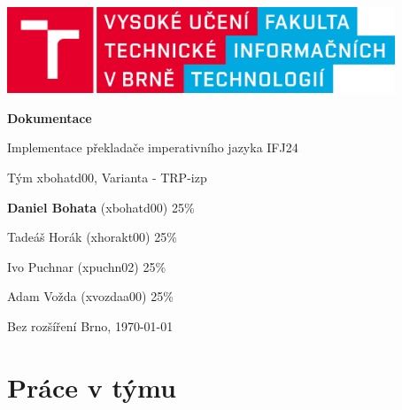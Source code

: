 \documentclass[a4paper, 12pt]{article}
\begin{document}
    \begin{titlepage}
        \begin{center}
            \includegraphics[width=0.87\textwidth]{images/logo_cz.png}
            \vspace*{6cm}

            \Huge{\textbf{Dokumentace}}
            \vspace{0.5cm}
            
            \LARGE{Implementace překladače imperativního jazyka IFJ24}
            \vspace{0.5cm}
            
            \Large{Tým xbohatd00, Varianta - TRP-izp}
            \vspace{2.5cm}
            
            \large{\textbf{Daniel Bohata} (xbohatd00) 25\%}
            \vspace{0.1cm}
            
            \large{Tadeáš Horák (xhorakt00) 25\%}
            \vspace{0.1cm}
            
            \large{Ivo Puchnar (xpuchn02) 25\%}
            \vspace{0.1cm}
            
            \large{Adam Vožda (xvozdaa00) 25\%}
            \vspace{0.1cm}
            
           \vfill
		   \begin{flushleft} 
		   \large
		   Bez rozšíření
		   \hfill
		   Brno, \today
		   \end{flushleft}
        \end{center}
    \end{titlepage}

\pagestyle{fancy}

\newpage
\tableofcontents


\newpage
{}
\section{Práce v týmu}
\end{document}

